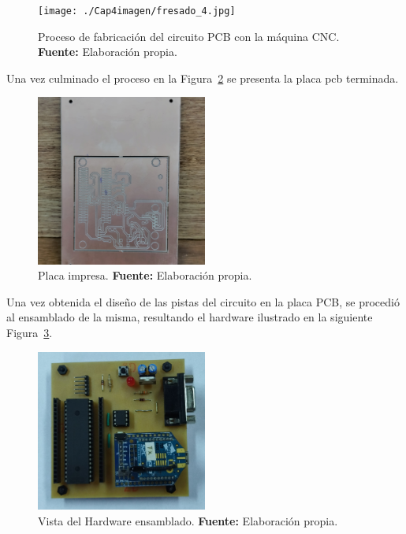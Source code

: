 \begin{figure}[H]
	\centering
		\texttt{[image: ./Cap4imagen/fresado\_4.jpg]}
	\caption[Proceso de fabricación del circuito PCB con la máquina CNC.]{Proceso de fabricación del circuito PCB con la máquina CNC.\textbf{ Fuente:} Elaboración propia.}
	\label{Esch8} %
\end{figure}






Una vez culminado el proceso en la Figura~\ref{Esch9} se presenta la placa pcb terminada. 


\begin{figure}[H]
	\centering
	\includegraphics[width=0.5\textwidth]{./Cap4imagen/placa_pcb_4.jpg}
	\caption[Placa impresa.]{Placa impresa. \textbf{ Fuente:} Elaboración propia.}
	\label{Esch9} %
\end{figure}

Una vez obtenida el diseño de las pistas del circuito en la placa PCB, se procedió al ensamblado de la misma, resultando el hardware ilustrado en la siguiente Figura~\ref{Esch10}.


 
\begin{figure}[H]
	\centering
	\includegraphics[width=0.5\textwidth]{./Cap4imagen/cto_ensamblado_4.jpg}
	\caption[Vista del Hardware ensamblado.]{Vista del Hardware ensamblado.\textbf{ Fuente:} Elaboración propia.}
	\label{Esch10} %
\end{figure}

